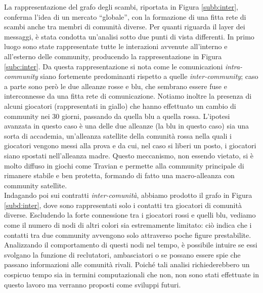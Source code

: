 La rappresentazione del grafo degli scambi, riportata in Figura \ref{subb:inter}, conferma l'idea di un mercato “globale”, con la formazione di una fitta rete di scambi anche tra membri di comunità diverse.
Per quanti riguarda il layer dei messaggi, è stata condotta un'analisi sotto due punti di vista differenti. In primo luogo sono state rappresentate tutte le interazioni avvenute all'interno e all'esterno delle community, producendo la rappresentazione in Figura \ref{subc:inter}. Da questa rappresentazione si nota come le comunicazioni \textit{intra-community} siano fortemente predominanti rispetto a quelle \textit{inter-community}; caso a parte sono però le due alleanze rosse e blu, che sembrano essere fuse e interconnesse da una fitta rete di comunicazione. Notiamo inoltre la presenza di alcuni giocatori (rappresentati in giallo) che hanno effettuato un cambio di community nei 30 giorni, passando da quella blu a quella rossa. L'ipotesi avanzata in questo caso è una delle due alleanze (la blu in questo caso) sia una sorta di accademia, un'alleanza satellite della comunità rossa nella quali i giocatori vengono messi alla prova e da cui, nel caso si liberi un posto, i giocatori siano spostati nell'alleanza madre. Questo meccanismo, non essendo vietato, si è molto diffuso in giochi come Travian e permette alla community principale di rimanere stabile e ben protetta, formando di fatto una macro-alleanza con community satellite.\\
Indagando poi sui contratti \textit{inter-comunità}, abbiamo prodotto il grafo in Figura \ref{subd:inter}, dove sono rappresentati solo i contatti tra giocatori di comunità diverse. Escludendo la forte connessione tra i giocatori rossi e quelli blu, vediamo come il numero di nodi di altri colori sia estremamente limitato: ciò indica che i contatti tra due community avvengono solo attraverso poche figure prestabilite. Analizzando il comportamento di questi nodi nel tempo, è possibile intuire se essi svolgano la funzione di reclutatori, ambasciatori o se possano essere spie che passano informazioni alle comunità rivali. Poiché tali analisi richiederebbero un cospicuo tempo sia in termini computazionali che non, non sono stati effettuate in questo lavoro ma verranno proposti come sviluppi futuri.
